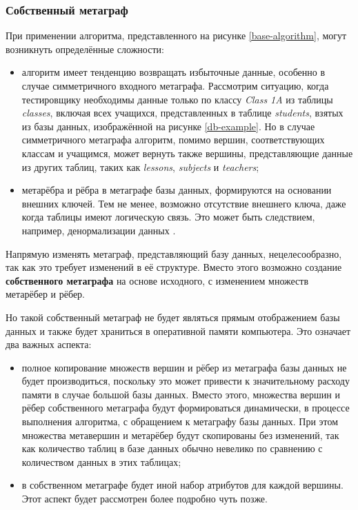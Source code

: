 \subsubsection{Собственный метаграф}

При применении алгоритма, представленного на рисунке \ref{base-algorithm}, могут возникнуть определённые сложности:

\begin{itemize}
  \item алгоритм имеет тенденцию возвращать избыточные данные, особенно в случае симметричного входного метаграфа. Рассмотрим ситуацию, когда тестировщику необходимы данные только по классу \textit{Class 1A} из таблицы \textit{classes}, включая всех учащихся, представленных в таблице \textit{students}, взятых из базы данных, изображённой на рисунке \ref{db-example}. Но в случае симметричного метаграфа алгоритм, помимо вершин, соответствующих классам и учащимся, может вернуть также вершины, представляющие данные из других таблиц, таких как \textit{lessons}, \textit{subjects} и \textit{teachers};
  \item метарёбра и рёбра в метаграфе базы данных, формируются на основании внешних ключей. Тем не менее, возможно отсутствие внешнего ключа, даже когда таблицы имеют логическую связь. Это может быть следствием, например, денормализации данных \cite{denormalization}.
\end{itemize}

Напрямую изменять метаграф, представляющий базу данных, нецелесообразно, так как это требует изменений в её структуре. Вместо этого возможно создание \textbf{собственного метаграфа} на основе исходного, с изменением множеств метарёбер и рёбер.

Но такой собственный метаграф не будет являться прямым отображением базы данных и также будет храниться в оперативной памяти компьютера. Это означает два важных аспекта:

\begin{itemize}
  \item полное копирование множеств вершин и рёбер из метаграфа базы данных не будет производиться, поскольку это может привести к значительному расходу памяти в случае большой базы данных. Вместо этого, множества вершин и рёбер собственного метаграфа будут формироваться динамически, в процессе выполнения алгоритма, с обращением к метаграфу базы данных. При этом множества метавершин и метарёбер будут скопированы без изменений, так как количество таблиц в базе данных обычно невелико по сравнению с количеством данных в этих таблицах;
  \item в собственном метаграфе будет иной набор атрибутов для каждой вершины. Этот аспект будет рассмотрен более подробно чуть позже.
\end{itemize}

